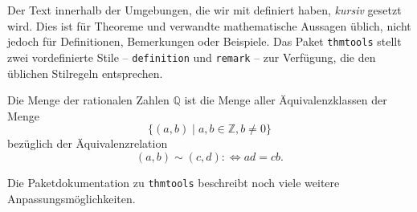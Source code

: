 Der Text innerhalb der Umgebungen, die wir mit  definiert haben, \emph{kursiv} gesetzt wird. Dies ist für Theoreme und verwandte mathematische Aussagen üblich, nicht jedoch für Definitionen, Bemerkungen oder Beispiele.
Das Paket \texttt{thmtools} stellt zwei vordefinierte Stile -- \texttt{definition} und \texttt{remark} -- zur Verfügung, die den üblichen Stilregeln entsprechen.

\begin{example}
\end{example}

\begin{LTXexample}
\begin{defin}
    Die Menge der rationalen 
    Zahlen $\mathbb Q$ ist die 
    Menge aller 
    \"Aquivalenzklassen der
    Menge
    \[\lbrace (a, b) \mid 
    a, b \in \mathbb Z, 
    b \neq 0\rbrace\]
    bezüglich der 
    \"Aquivalenzrelation
    \[(a, b) \sim (c, d) 
    :\Leftrightarrow
    ad = cb.
    \]
\end{defin}
\end{LTXexample}

Die Paketdokumentation \cite{thmtools} zu \texttt{thmtools} beschreibt noch viele weitere Anpassungsmöglichkeiten.




